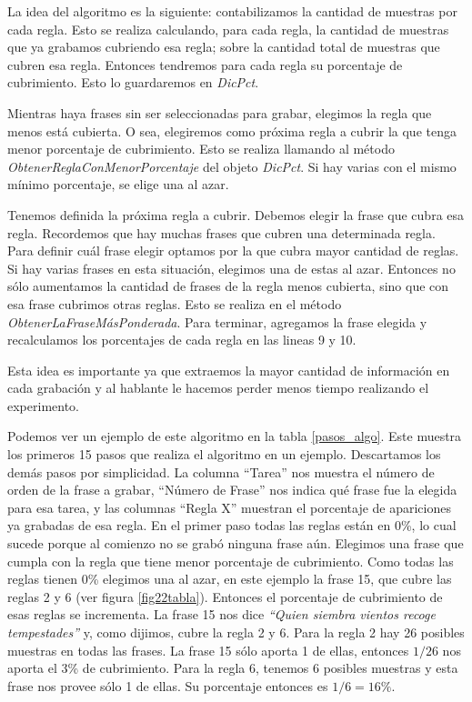 La idea del algoritmo es la siguiente:  contabilizamos la cantidad de muestras por cada regla. Esto se realiza calculando, para cada regla, la cantidad de muestras que ya grabamos cubriendo esa regla; sobre la cantidad total de muestras que cubren esa regla. Entonces tendremos para cada regla su porcentaje de cubrimiento. Esto lo guardaremos en \textit{DicPct}.

Mientras haya frases sin ser seleccionadas para grabar, elegimos la regla que menos está cubierta. O sea, elegiremos como próxima regla a cubrir la que tenga menor porcentaje de cubrimiento. Esto se realiza llamando al método \textit{ObtenerReglaConMenorPorcentaje} del objeto \textit{DicPct}. Si hay varias con el mismo mínimo porcentaje, se elige una al azar.

Tenemos definida la próxima regla a cubrir. Debemos elegir la frase que cubra esa regla. Recordemos que hay muchas frases que cubren una determinada regla. Para definir cuál frase elegir optamos por la que cubra mayor cantidad de reglas. Si hay varias frases en esta situación, elegimos una de estas al azar. Entonces no sólo aumentamos la cantidad de frases de la regla menos cubierta, sino que con esa frase cubrimos otras reglas. Esto se realiza en el método \textit{ObtenerLaFraseMásPonderada}. Para terminar, agregamos la frase elegida y recalculamos los porcentajes de cada regla en las lineas 9 y 10.

Esta idea es importante ya que extraemos la mayor cantidad de información en cada grabación y al hablante le hacemos perder menos tiempo realizando el experimento.

Podemos ver un ejemplo de este algoritmo en la tabla \ref{pasos_algo}. Este muestra los primeros 15 pasos que realiza el algoritmo en un ejemplo. Descartamos los demás pasos por simplicidad. La columna ``Tarea'' nos muestra el número de orden de la frase a grabar, ``Número de Frase'' nos indica qué frase fue la elegida para esa tarea, y las columnas ``Regla X'' muestran el porcentaje de apariciones ya grabadas de esa regla. En el primer paso todas las reglas están en 0\%, lo cual sucede porque al comienzo no se grabó ninguna frase aún.  Elegimos una frase que cumpla con la regla que tiene menor porcentaje de cubrimiento. Como todas las reglas tienen 0\% elegimos una al azar, en este ejemplo la frase 15, que cubre las reglas 2 y 6 (ver figura \ref{fig22tabla}). Entonces el porcentaje de cubrimiento de esas reglas se incrementa. 
La frase 15 nos dice \textit{``Quien siembra vientos recoge tempestades''} y, como dijimos, cubre la regla 2 y 6. Para la regla 2 hay 26 posibles muestras en todas las frases. La frase 15 sólo aporta 1 de ellas, entonces $1/26$ nos aporta el 3\% de cubrimiento. Para la regla 6, tenemos 6 posibles muestras y esta frase nos provee sólo 1 de ellas. Su porcentaje entonces es $1/6 = 16\%$. 

